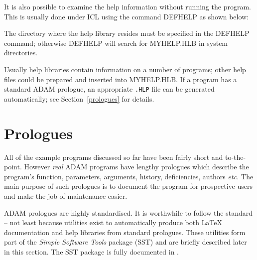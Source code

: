 \documentclass[twoside,11pt,nolof]{starlink}
\begin{document}
It is also possible to examine the help information without running the
program. This is usually done under ICL using the command DEFHELP as
shown below:
The directory where the help library resides must be specified in the
DEFHELP command; otherwise
DEFHELP will search for MYHELP.HLB in system directories.

Usually help libraries contain information on a number of programs;
other help files could be prepared and inserted into MYHELP.HLB.
If a program has a standard ADAM prologue,
an appropriate \texttt{.HLP} file can be generated automatically; see
Section~\ref{prologues} for details.

\newpage
\section{Prologues\label{prologues}}

All of the example programs discussed so far have been fairly short and
to-the-point.
However {\sl real\/} ADAM programs have lengthy prologues which describe
the program's function, parameters, arguments, history, deficiencies, authors
\textit{etc.}
The main purpose of such prologues is to document the program for
prospective users and make the job of maintenance easier.

ADAM prologues are highly standardised. It is worthwhile to follow the
standard --
not least because utilities exist to automatically produce
both {\LaTeX} documentation and help libraries from standard prologues.
These utilities form part
of the {\sl Simple Software Tools\/} package  (SST) and are briefly described
later in this section. The SST package is fully documented in
.
\end{document}
